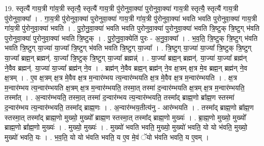 \documentclass[17pt]{extarticle}
\begin{document}
19. स्तृत्यै॑ गाय॒त्री गा॑य॒त्री स्तृत्यै॒ स्तृत्यै॑ गाय॒त्री पु॑रोनुवा॒क्या॑ पुरोनुवा॒क्या॑ गाय॒त्री स्तृत्यै॒ स्तृत्यै॑ गाय॒त्री पु॑रोनुवा॒क्या᳚ । . गा॒य॒त्री पु॑रोनुवा॒क्या॑ पुरोनुवा॒क्या॑ गाय॒त्री गा॑य॒त्री पु॑रोनुवा॒क्या॑ भवति भवति पुरोनुवा॒क्या॑ गाय॒त्री गा॑य॒त्री पु॑रोनुवा॒क्या॑ भवति । . पु॒रो॒नु॒वा॒क्या॑ भवति भवति पुरोनुवा॒क्या॑ पुरोनुवा॒क्या॑ भवति त्रि॒ष्टुक् त्रि॒ष्टुग् भ॑वति पुरोनुवा॒क्या॑ पुरोनुवा॒क्या॑ भवति त्रि॒ष्टुक् । . पु॒रो॒नु॒वा॒क्येति॑ पुरः - अ॒नु॒वा॒क्या᳚ । . भ॒व॒ति॒ त्रि॒ष्टुक् त्रि॒ष्टुग् भ॑वति भवति त्रि॒ष्टुग् या॒ज्या॑ या॒ज्या᳚ त्रि॒ष्टुग् भ॑वति भवति त्रि॒ष्टुग् या॒ज्या᳚ । . त्रि॒ष्टुग् या॒ज्या॑ या॒ज्या᳚ त्रि॒ष्टुक् त्रि॒ष्टुग् या॒ज्या᳚ ब्रह्म॒न् ब्रह्मन्॑. या॒ज्या᳚ त्रि॒ष्टुक् त्रि॒ष्टुग् या॒ज्या᳚ ब्रह्मन्न्॑ । . या॒ज्या᳚ ब्रह्म॒न् ब्रह्मन्॑. या॒ज्या॑ या॒ज्या᳚ ब्रह्म॑न् ने॒वैव ब्रह्मन्॑. या॒ज्या॑ या॒ज्या᳚ ब्रह्म॑न् ने॒व । . ब्रह्म॑न् ने॒वैव ब्रह्म॒न् ब्रह्म॑न् ने॒व क्ष॒त्रम् क्ष॒त्र मे॒व ब्रह्म॒न् ब्रह्म॑न् ने॒व क्ष॒त्रम् । . ए॒व क्ष॒त्रम् क्ष॒त्र मे॒वैव क्ष॒त्र म॒न्वार॑म्भय त्य॒न्वार॑म्भयति क्ष॒त्र मे॒वैव क्ष॒त्र म॒न्वार॑म्भयति । . क्ष॒त्र म॒न्वार॑म्भय त्य॒न्वार॑म्भयति क्ष॒त्रम् क्ष॒त्र म॒न्वार॑म्भयति॒ तस्मा॒त् तस्मा॑ द॒न्वार॑म्भयति क्ष॒त्रम् क्ष॒त्र म॒न्वार॑म्भयति॒ तस्मा᳚त् । . अ॒न्वार॑म्भयति॒ तस्मा॒त् तस्मा॑ द॒न्वार॑म्भय त्य॒न्वार॑म्भयति॒ तस्मा᳚द् ब्राह्म॒णो 
ब्रा᳚ह्म॒ण स्तस्मा॑ द॒न्वार॑म्भय त्य॒न्वार॑म्भयति॒ तस्मा᳚द् ब्राह्म॒णः । . अ॒न्वार॑म्भय॒तीत्य॑नु - आर॑म्भयति । . तस्मा᳚द् ब्राह्म॒णो ब्रा᳚ह्म॒ण स्तस्मा॒त् तस्मा᳚द् ब्राह्म॒णो मुख्यो॒ मुख्यो᳚ ब्राह्म॒ण स्तस्मा॒त् तस्मा᳚द् ब्राह्म॒णो मुख्यः॑ । . ब्रा॒ह्म॒णो मुख्यो॒ मुख्यो᳚ ब्राह्म॒णो ब्रा᳚ह्म॒णो मुख्यः॑ । . मुख्यो॒ मुख्यः॑ । . मुख्यो॑ भवति भवति॒ मुख्यो॒ मुख्यो॑ भवति॒ यो यो भ॑वति॒ मुख्यो॒ मुख्यो॑ भवति॒ यः । . भ॒व॒ति॒ यो यो भ॑वति भवति॒ य ए॒व मे॒वं ॅयो भ॑वति भवति॒ य ए॒वम् । \newline
\end{document}
